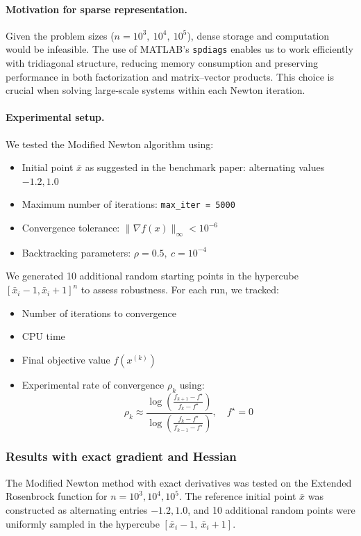 \documentclass[a4paper,12pt]{article}
\begin{document}
	
	\paragraph{Motivation for sparse representation.}
	Given the problem sizes (\(n = 10^3,\ 10^4,\ 10^5\)), dense storage and computation would be infeasible. The use of MATLAB’s \verb|spdiags| enables us to work efficiently with tridiagonal structure, reducing memory consumption and preserving performance in both factorization and matrix–vector products. This choice is crucial when solving large-scale systems within each Newton iteration.
	
	\newpage
	\paragraph{Experimental setup.}
	We tested the Modified Newton algorithm using:
	\begin{itemize}[nosep]
		\item Initial point \(\bar{x}\) as suggested in the benchmark paper: alternating values \(-1.2, 1.0\)
		\item Maximum number of iterations: \verb|max_iter = 5000|
		\item Convergence tolerance: \(\|\nabla f(x)\|_\infty < 10^{-6}\)
		\item Backtracking parameters: \(\rho = 0.5,\ c = 10^{-4}\)
	\end{itemize}
	
	We generated 10 additional random starting points in the hypercube \([\bar{x}_i - 1, \bar{x}_i + 1]^n\) to assess robustness. For each run, we tracked:
	\begin{itemize}[nosep]
		\item Number of iterations to convergence
		\item CPU time
		\item Final objective value \(f(x^{(k)})\)
		\item Experimental rate of convergence \(\rho_k\) using:
		\[
		\rho_k \approx \frac{\log\left(\frac{f_{k+1} - f^\star}{f_k - f^\star}\right)}{\log\left(\frac{f_k - f^\star}{f_{k-1} - f^\star}\right)}, \quad f^\star = 0
		\]
	\end{itemize}
	
	\subsubsection*{Results with exact gradient and Hessian}
	
	The Modified Newton method with exact derivatives was tested on the Extended Rosenbrock function for \( n = 10^3, 10^4, 10^5 \). The reference initial point \( \bar{x} \) was constructed as alternating entries \( -1.2, 1.0 \), and 10 additional random points were uniformly sampled in the hypercube \([\bar{x}_i - 1,\ \bar{x}_i + 1]\).
	
\end{document}
